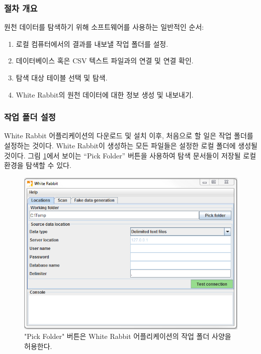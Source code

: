 \documentclass[11pt]{book}
\providecommand{\tightlist}{%
  \setlength{\itemsep}{0pt}\setlength{\parskip}{0pt}}
\theoremstyle{definition}
\theoremstyle{definition}
\theoremstyle{definition}
\theoremstyle{remark}
\begin{document}
\subsubsection*{절차 개요}\label{-}

원천 데이터를 탐색하기 위해 소프트웨어를 사용하는 일반적인 순서:

\begin{enumerate}
\def\labelenumi{\arabic{enumi}.}
\tightlist
\item
  로컬 컴퓨터에서의 결과를 내보낼 작업 폴더를 설정.
\item
  데이터베이스 혹은 CSV 텍스트 파일과의 연결 및 연결 확인.
\item
  탐색 대상 테이블 선택 및 탐색.
\item
  White Rabbit의 원천 데이터에 대한 정보 생성 및 내보내기.
\end{enumerate}

\subsubsection*{작업 폴더 설정}\label{--}

White Rabbit 어플리케이션의 다운로드 및 설치 이후, 처음으로 할 일은 작업
폴더를 설정하는 것이다. White Rabbit이 생성하는 모든 파일들은 설정한
로컬 폴더에 생성될 것이다. 그림 \ref{fig:WhiteRabbitLocation}에서 보이는
``Pick Folder'' 버튼을 사용하여 탐색 문서들이 저장될 로컬 환경을 탐색할
수 있다.

\begin{figure}

{\centering \includegraphics[width=1\linewidth]{images/ExtractTransformLoad/WhiteRabbitLocation} 

}

\caption{"Pick Folder" 버튼은 White Rabbit 어플리케이션의 작업 폴더 사양을 허용한다.}\label{fig:WhiteRabbitLocation}
\end{figure}
\end{document}
